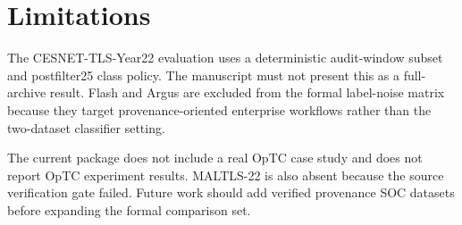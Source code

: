 \section{Limitations}
The CESNET-TLS-Year22 evaluation uses a deterministic audit-window subset and postfilter25 class policy. The manuscript must not present this as a full-archive result. Flash and Argus are excluded from the formal label-noise matrix because they target provenance-oriented enterprise workflows rather than the two-dataset classifier setting.

The current package does not include a real OpTC case study and does not report OpTC experiment results. MALTLS-22 is also absent because the source verification gate failed. Future work should add verified provenance SOC datasets before expanding the formal comparison set.
